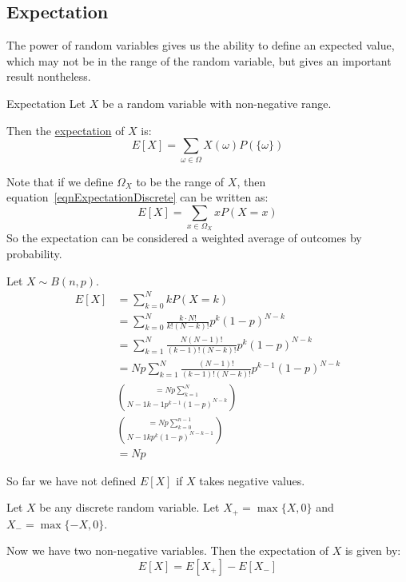 \documentclass[../Main.tex]{subfiles}
\begin{document}
\subsection{Expectation}
The power of random variables gives us the ability to define an expected value, which may not be in the range of the random variable, but gives an important result nontheless.
\begin{definition}{Expectation}
    Let $X$ be a random variable with non-negative range.\par
    Then the \underline{expectation} of $X$ is:
    \begin{equation}
        E[X] = \sum_{\omega \in \Omega} X(\omega) P(\{\omega\})
        \label{eqnExpectationDiscrete}
    \end{equation}
\end{definition}
Note that if we define $\Omega_X$ to be the range of $X$, then equation~\ref{eqnExpectationDiscrete} can be written as:
\begin{equation*}
    E[X] = \sum_{x \in \Omega_X} x P(X = x)
\end{equation*}
So the expectation can be considered a weighted average of outcomes by probability.
\begin{example}
    Let $X \sim B(n, p)$.
    \begin{align*}
    E[X] &= \sum_{k=0}^N k P(X = k) \\
    &= \sum_{k=0}^N \frac{k \cdot N!}{k! (N-k)!} p^k (1-p)^{N-k} \\
    &= \sum_{k=1}^N \frac{N (N-1)!}{(k-1)!(N-k)!} p^k (1-p)^{N-k} \\
    &= Np \sum_{k=1}^N \frac{(N-1)!}{(k-1)!(N-k)!} p^{k-1} (1-p)^{N-k} \\
    &= Np \sum_{k=1}^N \choose{N-1}{k-1} p^{k-1} (1-p)^{N-k} \\
    &= Np \sum_{k=0}^{n-1} \choose{N-1}{k} p^k (1-p)^{N-k-1} \\
    &= Np
    \end{align*}
\end{example}
So far we have not defined $E[X]$ if $X$ takes negative values.\par
Let $X$ be any discrete random variable. Let $X_+ = \max{\{X, 0\}}$ and $X_- = \max{\{-X, 0\}}$.\par
Now we have two non-negative variables. Then the expectation of $X$ is given by:
\begin{equation}
    E[X] = E[X_+] - E[X_-]
    \label{eqnExpectationNegativeDiscrete}
\end{equation}
\end{document}
